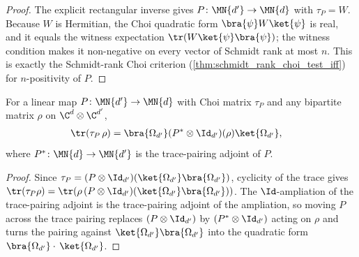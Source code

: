 \begin{proof}
    \leanok
    The explicit rectangular inverse gives $P\colon\MN{d'}\to\MN{d}$ with $\tau_P=W$.
    Because $W$ is Hermitian, the Choi quadratic form
    $\bra{\psi}W\ket{\psi}$ is real, and it equals the witness expectation
    $\tr(W\ket{\psi}\bra{\psi})$; the witness condition makes it non-negative on every
    vector of Schmidt rank at most $n$. This is exactly the Schmidt-rank Choi criterion
    (\ref{thm:schmidt_rank_choi_test_iff}) for $n$-positivity of $P$.
\end{proof}

\begin{theorem}
    \label{thm:trace_choiMatrix_omega_quadratic_adjoint}
    \leanok
    For a linear map $P\colon\MN{d'}\to\MN{d}$ with Choi matrix $\tau_P$ and any bipartite
    matrix $\rho$ on $\C^d\otimes\C^{d'}$,
    \begin{align}
        \tr(\tau_P\,\rho)
         & =\bra{\Omega_{d'}}(P^{*}\otimes\Id_{d'})(\rho)\ket{\Omega_{d'}},
        \notag
    \end{align}
    where $P^{*}\colon\MN{d}\to\MN{d'}$ is the trace-pairing adjoint of $P$.
\end{theorem}

\begin{proof}
    \leanok
    Since $\tau_P=(P\otimes\Id_{d'})(\ket{\Omega_{d'}}\bra{\Omega_{d'}})$, cyclicity
    of the trace gives
    $\tr(\tau_P\rho)=\tr(\rho\,(P\otimes\Id_{d'})(\ket{\Omega_{d'}}\bra{\Omega_{d'}}))$.
    The
    $\Id$-ampliation of the trace-pairing adjoint is the trace-pairing adjoint of the
    ampliation, so moving $P$ across the trace pairing replaces
    $(P\otimes\Id_{d'})$ by $(P^{*}\otimes\Id_{d'})$ acting on $\rho$ and turns the
    pairing against $\ket{\Omega_{d'}}\bra{\Omega_{d'}}$ into the quadratic form
    $\bra{\Omega_{d'}} \cdot\,\ket{\Omega_{d'}}$.
\end{proof}
